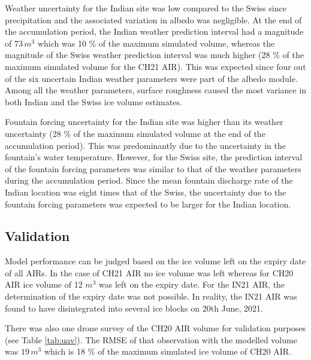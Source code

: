 \documentclass[utf8]{frontiersSCNS}
\begin{document}
Weather uncertainty for the Indian site was low compared to the Swiss since precipitation and the associated
variation in albedo was negligible. At the end of the accumulation period, the Indian weather prediction
interval had a magnitude of  $73\,m^3$ which was 10 \% of the maximum simulated volume, whereas the magnitude of
the Swiss weather prediction interval was much higher (28 \% of the maximum simulated volume for the CH21 AIR).
This was expected since four out of the six uncertain Indian weather parameters were part of the albedo module. Among
all the weather parameters, surface roughness caused the most variance in both Indian and the Swiss ice
volume estimates.

Fountain forcing uncertainty for the Indian site was higher than its weather uncertainty (28 \% of the maximum
simulated volume at the end of the accumulation period). This was predominantly due to the uncertainty in the
fountain's water temperature. However, for the Swiss site, the prediction interval of the fountain forcing
parameters was similar to that of the weather parameters during the accumulation period. Since the mean fountain
discharge rate of the Indian location was eight times that of the Swiss, the uncertainty due to the fountain
forcing parameters was expected to be larger for the Indian location.

\subsection{Validation}

Model performance can be judged based on the ice volume left on the expiry date of all AIRs. In the case of CH21
AIR no ice volume was left whereas for CH20 AIR ice volume of 12 $m^3$ was left on the expiry date. For the IN21
AIR, the determination of the expiry date was not possible. In reality, the IN21 AIR was found to have
disintegrated into several ice blocks on 20th June, 2021. 

There was also one drone survey of the CH20 AIR volume for validation purposes (see Table \ref{tab:uav}). The
RMSE of that observation with the modelled volume was $19\, m^3$ which is 18 \% of the maximum simulated ice
volume of CH20 AIR.
\end{document}
